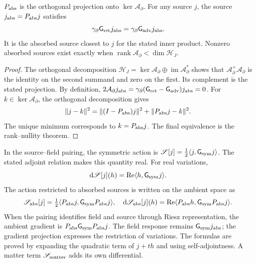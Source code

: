 \begin{theorem}
\label{vii:thm:proyeccion-absorcion}
\(P_{\rm abs}\) is the orthogonal projection onto
\(\ker\mathcal A_\partial\). For any source \(j\), the source
\(j_{\rm abs}=P_{\rm abs}j\) satisfies
\begin{equation}
 \gamma_\partial \mathsf{G}_{\rm ret}j_{\rm abs}
 =\gamma_\partial \mathsf{G}_{\rm adv}j_{\rm abs}.
 \label{vii:eq:igualdad-borde-absorbido}
\end{equation}
It is the absorbed source closest to \(j\) for the stated inner product.
Nonzero absorbed sources exist exactly when
\(\operatorname{rank}\mathcal A_\partial<\dim\mathcal H_J\).
\end{theorem}
\begin{proof}
The orthogonal decomposition
\(\mathcal H_J=\ker\mathcal A_\partial\oplus
 \operatorname{im}\mathcal A_\partial^*\) shows that
\(\mathcal A_\partial^+\mathcal A_\partial\) is the identity on the
second summand and zero on the first. Its complement is the stated
projection. By definition,
\(2\mathcal A_\partial j_{\rm abs}
 =\gamma_\partial(\mathsf{G}_{\rm ret}-\mathsf{G}_{\rm adv})j_{\rm abs}=0\).
For \(k\in\ker\mathcal A_\partial\), the orthogonal decomposition gives
\[
 \|j-k\|^2=\|(I-P_{\rm abs})j\|^2+\|P_{\rm abs}j-k\|^2.
\]
The unique minimum corresponds to \(k=P_{\rm abs}j\).
The final equivalence is the rank--nullity theorem.
\end{proof}

In the source--field pairing, the symmetric action is
\(\mathscr S[j]=\tfrac12\langle j,\mathsf{G}_{\rm sym}j\rangle\).
The stated adjoint relation makes this quantity real. For real variations,
\[
 \mathrm d\mathscr S[j](h)
 =\operatorname{Re}\langle h,\mathsf{G}_{\rm sym}j\rangle.
\]
The action restricted to absorbed sources is written on the ambient space as
\begin{equation}
 \mathscr S_{\rm abs}[j]
 =\tfrac12\langle P_{\rm abs}j,\mathsf{G}_{\rm sym}P_{\rm abs}j\rangle,
 \quad
 \mathrm d\mathscr S_{\rm abs}[j](h)
 =\operatorname{Re}\langle P_{\rm abs}h,\mathsf{G}_{\rm sym}P_{\rm abs}j\rangle.
 \label{vii:eq:variacion-restringida-absorcion}
\end{equation}
When the pairing identifies field and source through Riesz representation,
the ambient gradient is \(P_{\rm abs}\mathsf{G}_{\rm sym}P_{\rm abs}j\).
The field response remains \(\mathsf{G}_{\rm sym}j_{\rm abs}\); the gradient
projection expresses the restriction of variations.
The formulas are proved by expanding the quadratic term of
\(j+th\) and using self-adjointness. A matter term
\(\mathscr S_{\rm matter}\) adds its own differential.

